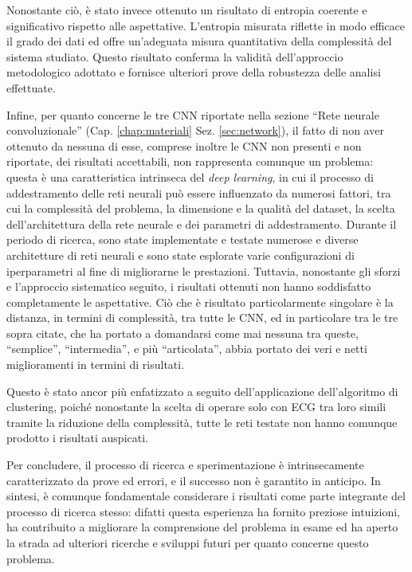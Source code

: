 Nonostante ciò, è stato invece ottenuto un risultato di entropia coerente e significativo rispetto alle aspettative. L'entropia misurata riflette in modo efficace il grado dei dati ed offre un'adeguata misura quantitativa della complessità del sistema studiato. Questo risultato conferma la validità dell'approccio metodologico adottato e fornisce ulteriori prove della robustezza delle analisi effettuate.

Infine, per quanto concerne le tre CNN riportate nella sezione ``Rete neurale convoluzionale'' (Cap. \ref{chap:materiali} Sez. \ref{sec:network}), il fatto di non aver ottenuto da nessuna di esse, comprese inoltre le CNN non presenti e non riportate, dei risultati accettabili, non rappresenta comunque un problema: questa è una caratteristica intrinseca del \textit{deep learning}, in cui il processo di addestramento delle reti neurali può essere influenzato da numerosi fattori, tra cui la complessità del problema, la dimensione e la qualità del dataset, la scelta dell'architettura della rete neurale e dei parametri di addestramento. Durante il periodo di ricerca, sono state implementate e testate numerose e diverse architetture di reti neurali e sono state esplorate varie configurazioni di iperparametri al fine di migliorarne le prestazioni. Tuttavia, nonostante gli sforzi e l'approccio sistematico seguito, i risultati ottenuti non hanno soddisfatto completamente le aspettative. Ciò che è risultato particolarmente singolare è la distanza, in termini di complessità, tra tutte le CNN, ed in particolare tra le tre sopra citate, che ha portato a domandarsi come mai nessuna tra queste, ``semplice'', ``intermedia'', e più ``articolata'', abbia portato dei veri e netti miglioramenti in termini di risultati.

Questo è stato ancor più enfatizzato a seguito dell'applicazione dell'algoritmo di clustering, poiché nonostante la scelta di operare solo con ECG tra loro simili tramite la riduzione della complessità, tutte le reti testate non hanno comunque prodotto i risultati auspicati.

Per concludere, il processo di ricerca e sperimentazione è intrinsecamente caratterizzato da prove ed errori, e il successo non è garantito in anticipo. In sintesi, è comunque fondamentale considerare i risultati come parte integrante del processo di ricerca stesso: difatti questa esperienza ha fornito preziose intuizioni, ha contribuito a migliorare la comprensione del problema in esame ed ha aperto la strada ad ulteriori ricerche e sviluppi futuri per quanto concerne questo problema.

